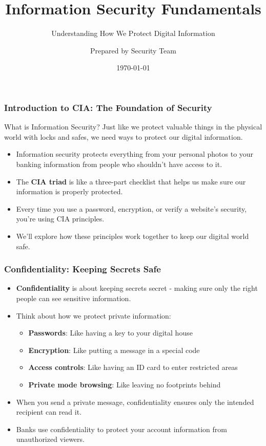 \documentclass{beamer}
\title{Information Security Fundamentals}
\subtitle{Understanding How We Protect Digital Information}
\author{Prepared by Security Team}
\date{\today}
\begin{document}
\begin{frame}
    \titlepage
\end{frame}

\begin{frame}
    \frametitle{Introduction to CIA: The Foundation of Security}
    \begin{block}{What is Information Security?}
        Just like we protect valuable things in the physical world with locks and safes, we need ways to protect our digital information.
    \end{block}
    \begin{itemize}
        \item Information security protects everything from your personal photos to your banking information from people who shouldn't have access to it.
        \item The \textbf{CIA triad} is like a three-part checklist that helps us make sure our information is properly protected.
        \item Every time you use a password, encryption, or verify a website's security, you're using CIA principles.
        \item We'll explore how these principles work together to keep our digital world safe.
    \end{itemize}
\end{frame}

\begin{frame}
    \frametitle{Confidentiality: Keeping Secrets Safe}
    \begin{itemize}
        \item \textbf{Confidentiality} is about keeping secrets secret - making sure only the right people can see sensitive information.
        \item Think about how we protect private information:
            \begin{itemize}
                \item \textbf{Passwords}: Like having a key to your digital house
                \item \textbf{Encryption}: Like putting a message in a special code
                \item \textbf{Access controls}: Like having an ID card to enter restricted areas
                \item \textbf{Private mode browsing}: Like leaving no footprints behind
            \end{itemize}
        \item When you send a private message, confidentiality ensures only the intended recipient can read it.
        \item Banks use confidentiality to protect your account information from unauthorized viewers.
    \end{itemize}
\end{frame}
\end{document}

